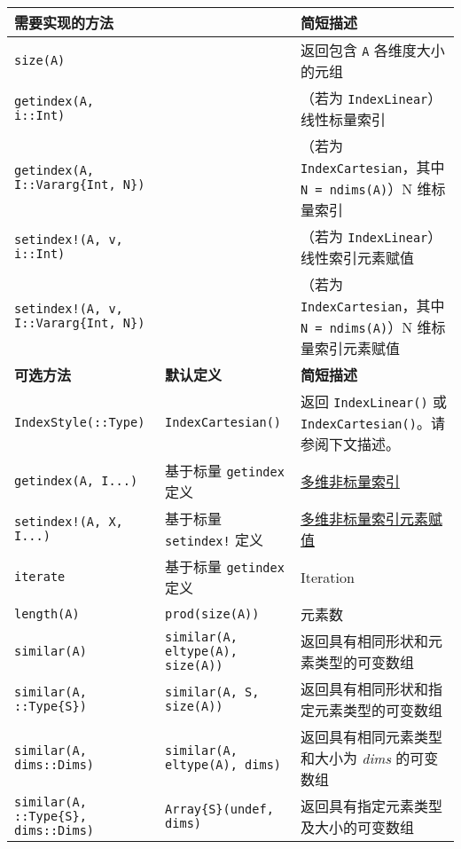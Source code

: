 


\begin{landscape}

\begin{table}[h] 
  \centering 
\begin{tabulary}{\linewidth}{LLL}
  \toprule
  \textbf{需要实现的方法} &  & \textbf{简短描述} \\
  \midrule
  
  \texttt{size(A)} &  & 返回包含 \texttt{A} 各维度大小的元组 \\ \midrule
  \texttt{getindex(A, i::Int)} &  & （若为 \texttt{IndexLinear}）线性标量索引 \\ \midrule
  \texttt{getindex(A, I::Vararg\{Int, N\})} &  & （若为 \texttt{IndexCartesian}，其中 \texttt{N = ndims(A)}）N 维标量索引 \\ \midrule
  \texttt{setindex!(A, v, i::Int)} &  & （若为 \texttt{IndexLinear}）线性索引元素赋值 \\ \midrule
  \texttt{setindex!(A, v, I::Vararg\{Int, N\})} &  & （若为 \texttt{IndexCartesian}，其中 \texttt{N = ndims(A)}）N 维标量索引元素赋值 \\ 
  
  \toprule
  \textbf{可选方法} & \textbf{默认定义} & \textbf{简短描述} \\ 
  \midrule
  \texttt{IndexStyle(::Type)} & \texttt{IndexCartesian()} & 返回 \texttt{IndexLinear()} 或 \texttt{IndexCartesian()}。请参阅下文描述。 \\ \midrule
  \texttt{getindex(A, I...)} & 基于标量 \texttt{getindex} 定义 & \hyperlink{14469287548874312017}{多维非标量索引} \\ \midrule
  \texttt{setindex!(A, X, I...)} & 基于标量 \texttt{setindex!} 定义 & \hyperlink{14469287548874312017}{多维非标量索引元素赋值} \\ \midrule
  \texttt{iterate} & 基于标量 \texttt{getindex} 定义 & Iteration \\ \midrule
  \texttt{length(A)} & \texttt{prod(size(A))} & 元素数 \\ \midrule
  \texttt{similar(A)} & \texttt{similar(A, eltype(A), size(A))} & 返回具有相同形状和元素类型的可变数组 \\ \midrule
  \texttt{similar(A, ::Type\{S\})} & \texttt{similar(A, S, size(A))} & 返回具有相同形状和指定元素类型的可变数组 \\ \midrule
  \texttt{similar(A, dims::Dims)} & \texttt{similar(A, eltype(A), dims)} & 返回具有相同元素类型和大小为 \emph{dims} 的可变数组 \\ \midrule
  \texttt{similar(A, ::Type\{S\}, dims::Dims)} & \texttt{Array\{S\}(undef, dims)} & 返回具有指定元素类型及大小的可变数组 \\ 
  

\end{tabulary}
\end{table}
\end{landscape}
